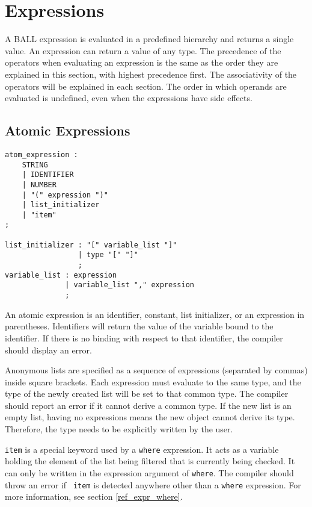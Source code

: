 
\section{Expressions}
A BALL expression is evaluated in a predefined hierarchy and returns a
single value. An expression can return a value of any type. The
precedence of the operators when evaluating an expression is the same
as the order they are explained in this section, with highest
precedence first. The associativity of the operators will be explained
in each section. The order in which operands are evaluated is
undefined, even when the expressions have side effects.

\subsection{Atomic Expressions}
\begin{verbatim}
atom_expression : 
    STRING
    | IDENTIFIER
    | NUMBER
    | "(" expression ")"
    | list_initializer
    | "item"
;

list_initializer : "[" variable_list "]"
                 | type "[" "]"
                 ;
variable_list : expression
              | variable_list "," expression
              ;
\end{verbatim} 

An atomic expression is an identifier, constant, list initializer, or
an expression in parentheses. Identifiers will return the value of the
variable bound to the identifier. If there is no binding with respect
to that identifier, the compiler should display an error.

Anonymous lists are specified as a sequence of expressions (separated
by commas) inside square brackets. Each expression must evaluate to
the same type, and the type of the newly created list will be set to
that common type. The compiler should report an error if it cannot
derive a common type. If the new list is an empty list, having no
expressions means the new object cannot derive its type. Therefore,
the type needs to be explicitly written by the user.

{\tt item} is a special keyword used by a {\tt where} expression. It
acts as a variable holding the element of the list being filtered that
is currently being checked. It can only be written in the expression
argument of {\tt where}. The compiler should throw an error if {\tt
  item} is detected anywhere other than a {\tt where} expression. For
more information, see section \ref{ref_expr_where}.

